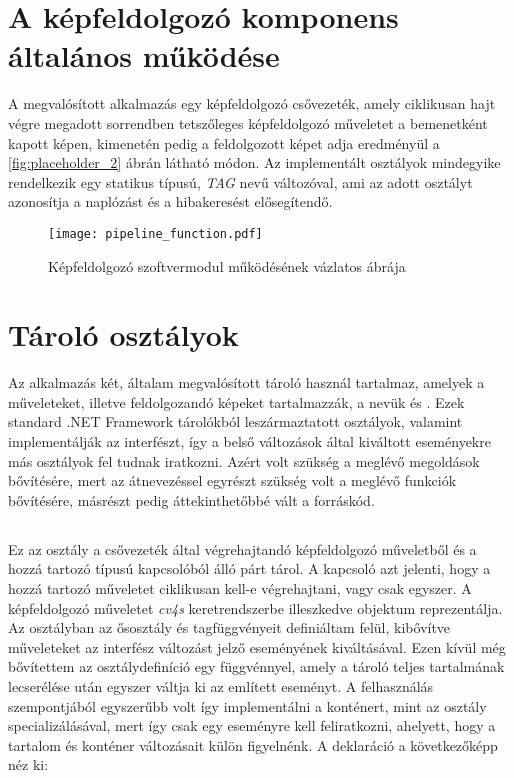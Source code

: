 \section{A képfeldolgozó komponens általános működése}

A megvalósított alkalmazás egy képfeldolgozó csővezeték, amely ciklikusan hajt végre megadott sorrendben tetszőleges képfeldolgozó műveletet a bemenetként kapott képen, kimenetén pedig a feldolgozott képet adja eredményül a \ref{fig:placeholder_2} ábrán látható módon. Az implementált osztályok mindegyike rendelkezik egy statikus  típusú, \emph{TAG} nevű változóval, ami az adott osztályt azonosítja a naplózást és a hibakeresést elősegítendő.

\begin{figure}[h]
\vspace{.5cm}
\texttt{[image: pipeline\_function.pdf]}
\centering
\vspace{.2cm}
\caption{Képfeldolgozó szoftvermodul működésének vázlatos ábrája}
\vspace{.5cm}
\label{fig:pipeline_function}
\end{figure}

\section{Tároló osztályok}

Az alkalmazás két, általam megvalósított tároló használ tartalmaz, amelyek a műveleteket, illetve feldolgozandó képeket tartalmazzák, a nevük  és . Ezek standard .NET Framework tárolókból leszármaztatott osztályok, valamint implementálják az   interfészt, így a belső változások által kiváltott eseményekre más osztályok fel tudnak iratkozni.
Azért volt szükség a meglévő megoldások bővítésére, mert az átnevezéssel egyrészt szükség volt a meglévő funkciók bővítésére, másrészt pedig áttekinthetőbbé vált a forráskód.

\subsection{} \label{subs:OperationList}
Ez az osztály a csővezeték által végrehajtandó képfeldolgozó műveletből és a hozzá tartozó típusú kapcsolóból álló párt tárol. A kapcsoló azt jelenti, hogy a hozzá tartozó műveletet ciklikusan kell-e végrehajtani, vagy csak egyszer. A képfeldolgozó műveletet \emph{cv4s} keretrendszerbe illeszkedve  objektum reprezentálja. Az osztályban az ősosztály  és  tagfüggvényeit definiáltam felül, kibővítve műveleteket az  interfész változást jelző eseményének kiváltásával. Ezen kívül még bővítettem az osztálydefiníció egy  függvénnyel, amely a tároló teljes tartalmának lecserélése után egyszer váltja ki az említett eseményt. A felhasználás szempontjából egyszerűbb volt így implementálni a konténert, mint az  osztály specializálásával, mert így csak egy eseményre kell feliratkozni, ahelyett, hogy a tartalom és konténer változásait külön figyelnénk.  A deklaráció a következőképp néz ki:

